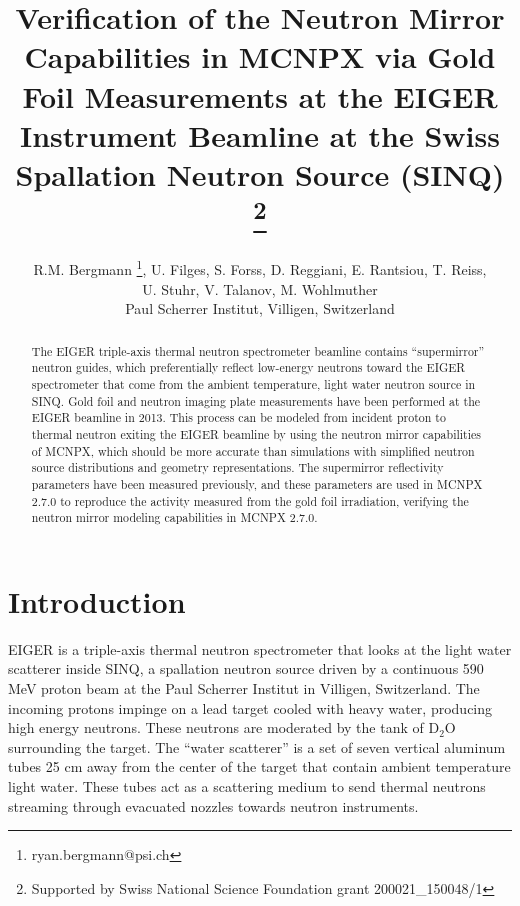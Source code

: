 \documentclass[a4paper,
              ]{jacow}
\begin{document}
\title{Verification of the Neutron Mirror Capabilities in MCNPX via Gold Foil Measurements at the EIGER Instrument Beamline at the Swiss Spallation Neutron Source (SINQ) \thanks{Supported by Swiss National Science Foundation grant 200021\_150048/1} }

\author{R.M. Bergmann \thanks{ryan.bergmann@psi.ch}, U. Filges, S. Forss, D. Reggiani, E. Rantsiou, T. Reiss, \\ U. Stuhr, V. Talanov, M. Wohlmuther \\ Paul Scherrer Institut, Villigen, Switzerland}

\maketitle

%
\begin{abstract}
   The EIGER triple-axis thermal neutron spectrometer beamline contains “supermirror” neutron guides, which preferentially reflect low-energy neutrons toward the EIGER spectrometer that come from the ambient temperature, light water neutron source in SINQ.  Gold foil and neutron imaging plate measurements have been performed at the EIGER beamline in 2013.  This process can be modeled from incident proton to thermal neutron exiting the EIGER beamline by using the neutron mirror capabilities of MCNPX, which should be more accurate than simulations with simplified neutron source distributions and geometry representations.  The supermirror reflectivity parameters have been measured previously, and these parameters are used in MCNPX 2.7.0 to reproduce the activity measured from the gold foil irradiation, verifying the neutron mirror modeling capabilities in MCNPX 2.7.0.
\end{abstract}


\section{Introduction}

EIGER is a triple-axis thermal neutron spectrometer that looks at the light water scatterer inside SINQ, a spallation neutron source driven by a continuous 590 MeV proton beam at the Paul Scherrer Institut in Villigen, Switzerland.  The incoming protons impinge on a lead target cooled with heavy water, producing high energy neutrons.  These neutrons are moderated by the tank of D$_2$O surrounding the target.  The ``water scatterer'' is a set of seven vertical aluminum tubes 25 cm away from the center of the target that contain ambient temperature light water.  These tubes act as a scattering medium to send thermal neutrons streaming through evacuated nozzles towards neutron instruments.  
\end{document}
